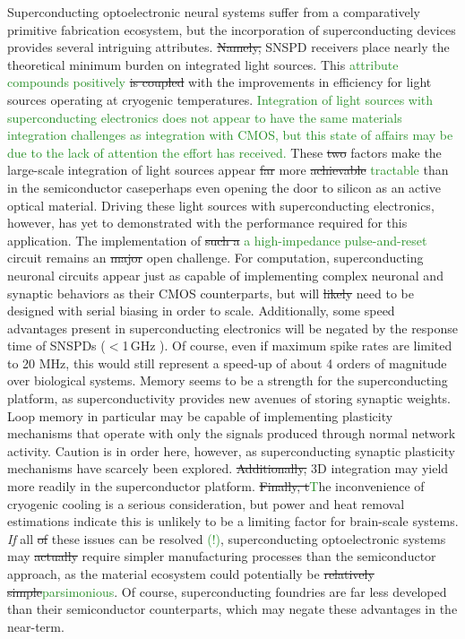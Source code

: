 \documentclass[twocolumn]{article}
\begin{document}
Superconducting optoelectronic neural systems suffer from a comparatively primitive fabrication ecosystem, but the incorporation of superconducting devices provides several intriguing attributes. \sout{Namely, }SNSPD receivers place nearly the theoretical minimum burden on integrated light sources. This \textcolor{ForestGreen}{attribute compounds positively} \sout{is coupled} with the improvements in efficiency for light sources operating at cryogenic temperatures. \textcolor{ForestGreen}{Integration of light sources with superconducting electronics does not appear to have the same materials integration challenges as integration with CMOS, but this state of affairs may be due to the lack of attention the effort has received.} These \sout{two} factors make the large-scale integration of light sources appear \sout{far} more \sout{achievable} \textcolor{ForestGreen}{tractable} than in the semiconductor case\textemdash perhaps even opening the door to silicon as an active optical material. Driving these light sources with superconducting electronics, however, has yet to demonstrated with the performance required for this application. The implementation of \sout{such a} \textcolor{ForestGreen}{a high-impedance pulse-and-reset} circuit remains an \sout{major} open challenge. For computation, superconducting neuronal circuits appear just as capable of implementing complex neuronal and synaptic behaviors as their CMOS counterparts, but will \sout{likely} need to be designed with serial biasing in order to scale. Additionally, some speed advantages present in superconducting electronics will be negated by the response time of SNSPDs ($<$1\,GHz ). Of course, even if maximum spike rates are limited to 20 MHz, this would still represent a speed-up of about 4 orders of magnitude over biological systems. Memory seems to be a strength for the superconducting platform, as superconductivity provides new avenues of storing synaptic weights. Loop memory in particular may be capable of implementing plasticity mechanisms that operate with only the signals produced through normal network activity. Caution is in order here, however, as superconducting synaptic plasticity mechanisms have scarcely been explored. \sout{Additionally, }3D integration may yield more readily in the superconductor platform. \sout{Finally, t}\textcolor{ForestGreen}{T}he inconvenience of cryogenic cooling is a serious consideration, but power and heat removal estimations indicate this is unlikely to be a limiting factor for brain-scale systems. \textit{If} all \sout{of} these issues can be resolved\textcolor{ForestGreen}{ (!)}, superconducting optoelectronic systems may \sout{actually} require simpler manufacturing processes than the semiconductor approach, as the material ecosystem could potentially be \sout{relatively simple}\textcolor{ForestGreen}{parsimonious}. Of course, superconducting foundries are far less developed than their semiconductor counterparts, which may negate these advantages in the near-term.
\end{document}
